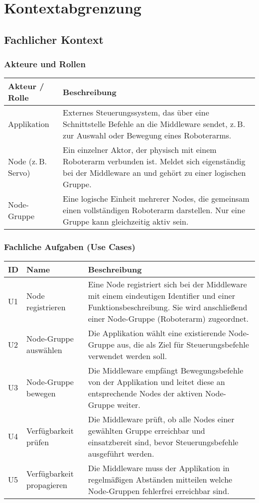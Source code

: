 \chapter{Kontextabgrenzung}


\section{Fachlicher Kontext}


\subsection{Akteure und Rollen}

\begin{tabular}{|p{4cm}|p{10cm}|}
	\hline
	\textbf{Akteur / Rolle} & \textbf{Beschreibung} \\
	\hline
	Applikation & Externes Steuerungssystem, das über eine Schnittstelle Befehle an die Middleware sendet, z.\,B. zur Auswahl oder Bewegung eines Roboterarms. \\
	\hline
	Node (z.\,B. Servo) & Ein einzelner Aktor, der physisch mit einem Roboterarm verbunden ist. Meldet sich eigenständig bei der Middleware an und gehört zu einer logischen Gruppe. \\
	\hline
	Node-Gruppe & Eine logische Einheit mehrerer Nodes, die gemeinsam einen vollständigen Roboterarm darstellen. Nur eine Gruppe kann gleichzeitig aktiv sein. \\
	\hline
\end{tabular}

\subsection{Fachliche Aufgaben (Use Cases)}

\begin{tabular}{|p{1.5cm}|p{4cm}|p{8.5cm}|}
	\hline
	\textbf{ID} & \textbf{Name} & \textbf{Beschreibung} \\
	\hline
	U1 & Node registrieren & Eine Node registriert sich bei der Middleware mit einem eindeutigen Identifier und einer Funktionsbeschreibung. Sie wird anschließend einer Node-Gruppe (Roboterarm) zugeordnet. \\
	\hline
	U2 & Node-Gruppe auswählen & Die Applikation wählt eine existierende Node-Gruppe aus, die als Ziel für Steuerungsbefehle verwendet werden soll. \\
	\hline
	U3 & Node-Gruppe bewegen & Die Middleware empfängt Bewegungsbefehle von der Applikation und leitet diese an entsprechende Nodes der aktiven Node-Gruppe weiter. \\
	\hline
	U4 & Verfügbarkeit prüfen & Die Middleware prüft, ob alle Nodes einer gewählten Gruppe erreichbar und einsatzbereit sind, bevor Steuerungsbefehle ausgeführt werden. \\
	\hline
	U5 & Verfügbarkeit propagieren & Die Middleware muss der Applikation in regelmäßigen Abständen mitteilen welche Node-Gruppen fehlerfrei erreichbar sind.\\
	\hline
\end{tabular}

